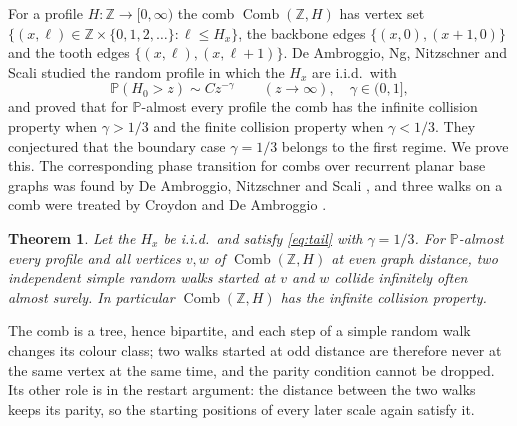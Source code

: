 \documentclass[11pt]{amsart}
\newtheorem{theorem}{Theorem}[section]
\theoremstyle{remark}
\numberwithin{equation}{section}
\newcommand{\Comb}{\operatorname{Comb}}
\newcommand{\PP}{\mathbb{P}}
\newcommand{\Z}{\mathbb{Z}}
\begin{document}
For a profile $H\colon\Z\to[0,\infty)$ the comb $\Comb(\Z,H)$ has vertex set $\{(x,\ell)\in\Z\times\{0,1,2,\dots\}:\ell\le H_x\}$, the backbone edges $\{(x,0),(x+1,0)\}$ and the tooth edges $\{(x,\ell),(x,\ell+1)\}$. De Ambroggio, Ng, Nitzschner and Scali \cite{DNNS} studied the random profile in which the $H_x$ are i.i.d.\ with
\begin{equation}\label{eq:tail}
\PP(H_0>z)\sim Cz^{-\gamma}\qquad(z\to\infty),\quad \gamma\in(0,1],
\end{equation}
and proved that for $\PP$-almost every profile the comb has the infinite collision property when $\gamma>1/3$ and the finite collision property when $\gamma<1/3$. They conjectured that the boundary case $\gamma=1/3$ belongs to the first regime. We prove this. The corresponding phase transition for combs over recurrent planar base graphs was found by De Ambroggio, Nitzschner and Scali \cite{DNS}, and three walks on a comb were treated by Croydon and De Ambroggio \cite{CD}.

\begin{theorem}\label{thm:main}
Let the $H_x$ be i.i.d.\ and satisfy \eqref{eq:tail} with $\gamma=1/3$. For $\PP$-almost every profile and all vertices $v,w$ of $\Comb(\Z,H)$ at even graph distance, two independent simple random walks started at $v$ and $w$ collide infinitely often almost surely. In particular $\Comb(\Z,H)$ has the infinite collision property.
\end{theorem}

The comb is a tree, hence bipartite, and each step of a simple random walk changes its colour class; two walks started at odd distance are therefore never at the same vertex at the same time, and the parity condition cannot be dropped. Its other role is in the restart argument: the distance between the two walks keeps its parity, so the starting positions of every later scale again satisfy it.
\end{document}
